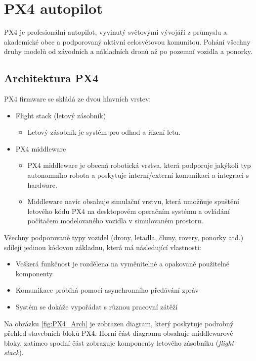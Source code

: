 \chapter{PX4 autopilot}

PX4 je profesionální autopilot, vyvinutý světovými vývojáři z průmyslu a akademické obce a podporovaný aktivní celosvětovou komunitou. Pohání všechny druhy modelů od závodních a nákladních dronů až po pozemní vozidla a ponorky. 

\section{Architektura PX4}

PX4 firmware se skládá ze dvou hlavních vrstev:
\begin{itemize}
    \item Flight stack (letový zásobník)
    \begin{itemize}
        \item Letový zásobník je systém pro odhad a řízení letu.
    \end{itemize}
    \item PX4 middleware
    \begin{itemize}
        \item PX4 middleware je obecná robotická vrstva, která podporuje jakýkoli typ autonomního robota a poskytuje interní/externí komunikaci a integraci s hardware.
        \item Middleware navíc obsahuje simulační vrstvu, která umožňuje spuštění letového kódu PX4 na desktopovém operačním systému a ovládání počítačem modelovaného vozidla v simulovaném prostoru.
    \end{itemize}
\end{itemize}
\hfill \break
Všechny podporované typy vozidel (drony, letadla, čluny, rovery, ponorky atd.) sdílejí jedinou kódovou základnu, která má následující vlastnosti: \cite{PX4docs}

\begin{itemize}
    \item Veškerá funkčnost je rozdělena na vyměnitelné a opakovaně použitelné komponenty
    \item Komunikace probíhá pomocí asynchronního předávání zpráv
    \item Systém se dokáže vypořádat s různou pracovní zátěží
\end{itemize}
\hfill \break
Na obrázku \ref{fig:PX4_Arch} je zobrazen diagram, který poskytuje podrobný přehled stavebních bloků PX4. Horní část diagramu obsahuje middlewarové bloky, zatímco spodní část zobrazuje komponenty letového zásobníku (\textit{flight stack}).

